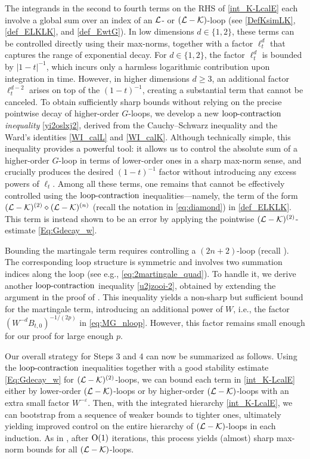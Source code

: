 The integrands in the second to fourth terms on the RHS of \eqref{int_K-LcalE} each involve a global sum over an index of an $\cal L$- or $(\cL-\cK)$-loop (see \eqref{DefKsimLK}, \eqref{def_ELKLK}, and \eqref{def_EwtG}). In low dimensions $d\in \{1,2\}$, these terms can be controlled directly using their max-norms, together with a factor $\ell_t^d$ that captures the range of exponential decay.
For $d\in\{1,2\}$, the factor $\ell_t^d$ is bounded by $|1-t|^{-1}$, which incurs only a harmless logarithmic contribution upon integration in time. However, in higher dimensions $d\ge 3$, an additional factor $\ell_t^{d-2}$ arises on top of the $(1-t)^{-1}$, creating a substantial term that cannot be canceled. 
To obtain sufficiently sharp bounds without relying on the precise pointwise decay of higher-order $G$-loops, we develop a new \emph{$\contract$ inequality} \eqref{yi2oslxj2}, derived from the Cauchy--Schwarz inequality and the Ward's identities \eqref{WI_calL} and \eqref{WI_calK}. Although technically simple, this inequality provides a powerful tool: it allows us to control the absolute sum of a higher-order $G$-loop in terms of lower-order ones in a sharp max-norm sense, and crucially produces the desired $(1-t)^{-1}$ factor without introducing any excess powers of $\ell_t$.
Among all these terms, one remains that cannot be effectively controlled using the $\contract$ inequalities---namely, the term of the form $(\cal L-\cal K)^{(2)}\diamond(\cal L-\cal K)^{(n)}$ (recall the notation in \eqref{eq:diamond}) in \eqref{def_ELKLK}. This term is instead shown to be an error by applying the pointwise $(\cal L-\cal K)^{(2)}$-estimate \eqref{Eq:Gdecay_w}.


Bounding the martingale term requires controlling a $(2n+2)$-loop (recall ). The corresponding loop structure is symmetric and involves two summation indices along the loop (see e.g., \eqref{eq:2martingale_quad}). To handle it, we derive another $\contract$ inequality \eqref{u2jzooi-2}, obtained by extending the argument in the proof of . This inequality yields a non-sharp but sufficient bound for the martingale term, introducing an additional power of $W$, i.e., the factor $(W^{-d}B_{t,0})^{-1/(2p)}$ in \eqref{eq:MG_nloop}. However, this factor remains small enough for our proof for large enough $p$.


Our overall strategy for Steps 3 and 4 can now be summarized as follows. Using the $\contract$ inequalities together with a good stability estimate \eqref{Eq:Gdecay_w} for $({\cal L}-{\cal K})^{(2)}$-loops, we can bound each term in \eqref{int_K-LcalE} either by lower-order $(\cL-\cK)$-loops or by higher-order $(\cL-\cK)$-loops with an extra small factor $W^{-\varepsilon}$. Then, with the integrated hierarchy \eqref{int_K-LcalE}, we can bootstrap from a sequence of weaker bounds to tighter ones, ultimately yielding improved control on the entire hierarchy of $(\cL -\cK)$-loops in each induction. As in \cite{YY_25, DYYY25, erdHos2025zigzag}, after $\OO(1)$ iterations, this process yields (almost) sharp max-norm bounds for all $(\cL-\cK)$-loops.



